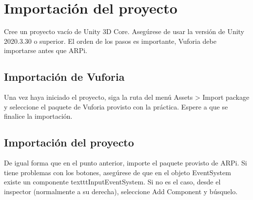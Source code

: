 \section{Importación del proyecto}
Cree un proyecto vacío de Unity 3D Core. Asegúrese de usar la versión de Unity 2020.3.30 o superior.
El orden de los pasos es importante, Vuforia debe importarse antes que ARPi.

\subsection{Importación de Vuforia}
Una vez haya iniciado el proyecto, siga la ruta del menú Assets > Import package y 
seleccione el paquete de Vuforia provisto con la práctica. Espere a que se finalice la importación.

\subsection{Importación del proyecto}
De igual forma que en el punto anterior, importe el paquete provisto de ARPi. 
Si tiene problemas con los botones, asegúrese de que en el objeto EventSystem existe un componente texttt{InputEventSystem}.
Si no es el caso, desde el inspector (normalmente a su derecha), seleccione Add Component y búsquelo.
